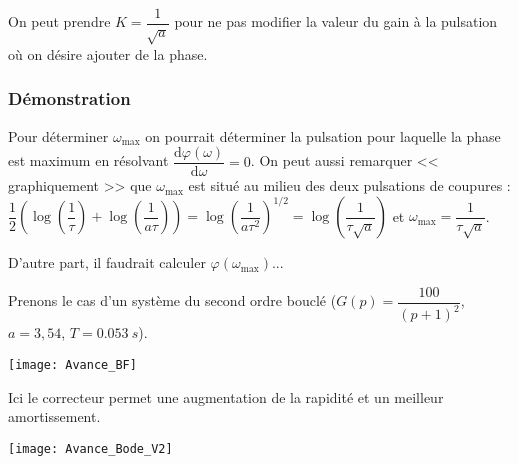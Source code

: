 \begin{remarque}
On peut prendre $K=\dfrac{1}{\sqrt{a}}$ pour ne pas modifier la valeur du gain à la pulsation où on désire ajouter de la phase. 
\end{remarque}



\subsubsection*{Démonstration}
Pour déterminer $\omega_{\max}$ on pourrait déterminer la pulsation pour laquelle la phase est maximum en résolvant $\dfrac{\text{d}\varphi\left(\omega \right)}{\text{d}\omega}=0$. 
On peut aussi remarquer << graphiquement >> que $\omega_{\text{max}}$ est situé au milieu des deux pulsations de coupures : $\dfrac{1}{2}\left(\log \left(\dfrac{1}{\tau}\right)+\log \left(\dfrac{1}{a\tau}\right)\right)=\log \left(\dfrac{1}{a\tau^2}\right)^{1/2}=\log \left(\dfrac{1}{\tau\sqrt{a}}\right)$ et $\omega_{\text{max}}=\dfrac{1}{\tau\sqrt{a}}$.

D'autre part, il faudrait calculer 
$\varphi\left(\omega_{\text{max}}\right)$...
%
%
%
%
%



\noindent
\begin{minipage}[c]{.46\linewidth}
Prenons le cas d'un système du second ordre bouclé ($G(p)=\dfrac{100}{\left(p+1\right)^2}$, $a=3,54$, $T=\SI{0,053}{s}$).

\begin{center}
\texttt{[image: Avance\_BF]}

\end{center}
Ici le correcteur permet une augmentation de la rapidité et un meilleur amortissement.
\end{minipage} \hfill
\begin{minipage}[c]{.46\linewidth}
\begin{center}
\texttt{[image: Avance\_Bode\_V2]}

\end{center}
\end{minipage} 




